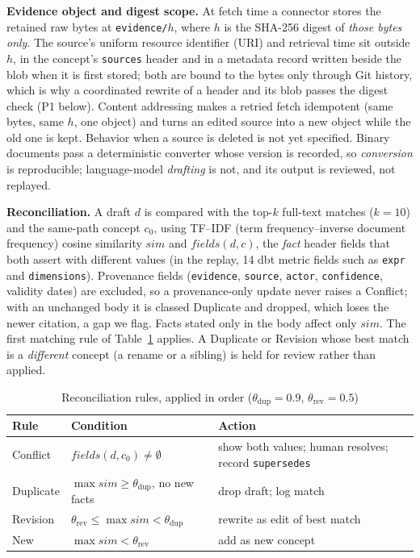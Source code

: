 \documentclass[conference,letterpaper]{IEEEtran}
\begin{document}
\textbf{Evidence object and digest scope.} At fetch time a connector stores the retained raw bytes at \texttt{evidence/}$h$, where $h$ is the SHA-256 digest of \emph{those bytes only}. The source's uniform resource identifier (URI) and retrieval time sit outside $h$, in the concept's \texttt{sources} header and in a metadata record written beside the blob when it is first stored; both are bound to the bytes only through Git history, which is why a coordinated rewrite of a header and its blob passes the digest check (P1 below). Content addressing makes a retried fetch idempotent (same bytes, same $h$, one object) and turns an edited source into a new object while the old one is kept. Behavior when a source is deleted is not yet specified.
Binary documents pass a deterministic converter whose version is recorded, so \emph{conversion} is reproducible; language-model \emph{drafting} is not, and its output is reviewed, not replayed.

\textbf{Reconciliation.} A draft $d$ is compared with the top-$k$ full-text matches ($k{=}10$) and the same-path concept $c_0$, using TF--IDF (term frequency--inverse document frequency) cosine similarity $\mathit{sim}$ and $\mathit{fields}(d,c)$, the \emph{fact} header fields that both assert with different values (in the replay, 14 dbt metric fields such as \texttt{expr} and \texttt{dimensions}). Provenance fields (\texttt{evidence}, \texttt{source}, \texttt{actor}, \texttt{confidence}, validity dates) are excluded, so a provenance-only update never raises a Conflict; with an unchanged body it is classed Duplicate and dropped, which loses the newer citation, a gap we flag. Facts stated only in the body affect only $\mathit{sim}$. The first matching rule of Table~\ref{tab:reconcile} applies. A Duplicate or Revision whose best match is a \emph{different} concept (a rename or a sibling) is held for review rather than applied.

\begin{table}[t]
\caption{Reconciliation rules, applied in order ($\theta_{\mathrm{dup}}{=}0.9$, $\theta_{\mathrm{rev}}{=}0.5$)}
\label{tab:reconcile}
\centering\scriptsize
\begin{tabular}{@{}lp{3.1cm}p{3.0cm}@{}}
\toprule
\textbf{Rule} & \textbf{Condition} & \textbf{Action}\\
\midrule
Conflict & $\mathit{fields}(d,c_0)\neq\emptyset$ & show both values; human resolves; record \texttt{supersedes}\\
Duplicate & $\max\mathit{sim}\ge\theta_{\mathrm{dup}}$, no new facts & drop draft; log match\\
Revision & $\theta_{\mathrm{rev}}\le\max\mathit{sim}<\theta_{\mathrm{dup}}$ & rewrite as edit of best match\\
New & $\max\mathit{sim}<\theta_{\mathrm{rev}}$ & add as new concept\\
\bottomrule
\end{tabular}
\end{table}
\end{document}
